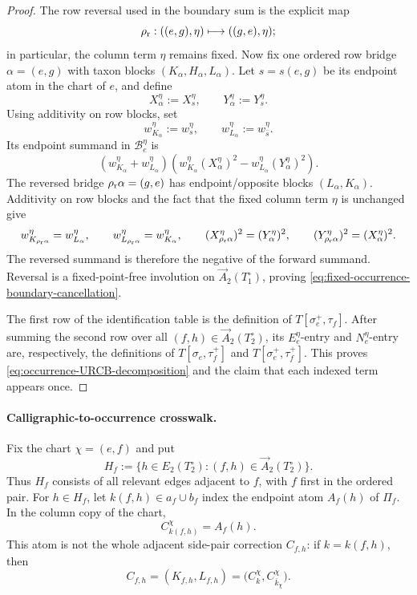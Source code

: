 \documentclass[11pt]{article}
\begin{document}
\begin{proof}
The row reversal used in the boundary sum is the explicit map
\[
\rho_{\rm r}:((e,g),\eta)\longmapsto((g,e),\eta);
\]
in particular, the column term $\eta$ remains fixed.  Now fix one
ordered row bridge
$\alpha=(e,g)$ with taxon blocks $(K_\alpha,H_\alpha,L_\alpha)$.
Let $s=s(e,g)$ be its endpoint atom in the chart of $e$, and define
\[
 X_\alpha^\eta:=X_s^\eta,
 \qquad
 Y_\alpha^\eta:=Y_s^\eta.
\]
Using additivity on row blocks, set
\[
 w_{K_\alpha}^\eta:=w_s^\eta,
 \qquad
 w_{L_\alpha}^\eta:=w_{\bar s}^\eta.
\]
Its endpoint summand in $\mathcal B_e^\eta$ is
\[
 (w_{K_\alpha}^\eta+w_{L_\alpha}^\eta)
 \left(w_{K_\alpha}^\eta (X_\alpha^\eta)^2
       -w_{L_\alpha}^\eta (Y_\alpha^\eta)^2\right).
\]
The reversed bridge $\rho_{\rm r}\alpha=(g,e)$ has endpoint/opposite blocks
$(L_\alpha,K_\alpha)$.  Additivity on row blocks and the fact that the fixed
column term $\eta$ is unchanged give
\[
 w_{K_{\rho_{\rm r}\alpha}}^\eta=w_{L_\alpha}^\eta,\qquad
 w_{L_{\rho_{\rm r}\alpha}}^\eta=w_{K_\alpha}^\eta,\qquad
 (X_{\rho_{\rm r}\alpha}^\eta)^2=(Y_\alpha^\eta)^2,\qquad
 (Y_{\rho_{\rm r}\alpha}^\eta)^2=(X_\alpha^\eta)^2.
\]
The reversed summand is therefore the negative of the forward summand.
Reversal is a fixed-point-free involution on
$\overrightarrow A_2(T_1^\circ)$, proving
\eqref{eq:fixed-occurrence-boundary-cancellation}.

The first row of the identification table is the definition of
$T[\sigma_e^+,\tau_f]$.  After summing the second row over all
$(f,h)\in\overrightarrow A_2(T_2^\circ)$, its $E_e^\eta$-entry and
$N_e^\eta$-entry are, respectively, the definitions of
$T[\sigma_e,\tau_f^+]$ and
$T[\sigma_e^+,\tau_f^+]$.  This proves
\eqref{eq:occurrence-URCB-decomposition} and the claim that each indexed term
appears once.
\end{proof}

\paragraph{Calligraphic-to-occurrence crosswalk.}
Fix the chart $\chi=(e,f)$ and put
\[
 H_f:=\{h\in E_2(T_2^\circ):
              (f,h)\in\overrightarrow A_2(T_2^\circ)\}.
\]
Thus $H_f$ consists of all relevant edges adjacent to $f$, with $f$ first in
the ordered pair.  For $h\in H_f$, let $k(f,h)\in a_f\cup b_f$ index the
endpoint atom $A_f(h)$ of $\Pi_f$.  In the column copy of the chart,
\[
 C_{k(f,h)}^\chi=A_f(h).
\]
This atom is not the whole adjacent side-pair correction $C_{f,h}$: if
$k=k(f,h)$, then
\[
 C_{f,h}=(K_{f,h},L_{f,h})
         =\bigl(C_k^\chi,C_{\bar k_\chi}^\chi\bigr).
\]
\end{document}
